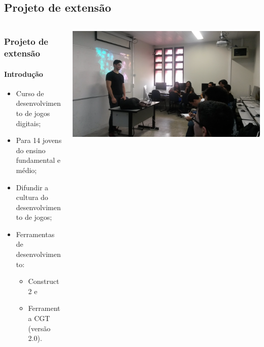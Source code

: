 \documentclass[]{beamer}
\begin{document}
   \subsection{Projeto de extensão}
   \begin{frame}
      \begin{columns}[T]
         \begin{column}{0.48\textwidth}
            \frametitle{Projeto de extensão}
            \framesubtitle{Introdução}
            \begin{itemize}
               \item Curso de desenvolvimento de jogos digitais;
               \item Para 14 jovens do ensino fundamental e médio;
               \item Difundir a cultura do desenvolvimento de jogos;
               \item Ferramentas de desenvolvimento:
                  \begin{itemize}
                     \item Construct 2 e
                     \item Ferramenta CGT (versão 2.0).
                  \end{itemize}
            \end{itemize}
         \end{column}
         \begin{column}{0.48\textwidth}
            \includegraphics[width=\textwidth]{images/ext/20150921_101616.jpg}
         \end{column}
      \end{columns}
   \end{frame}
\end{document}
